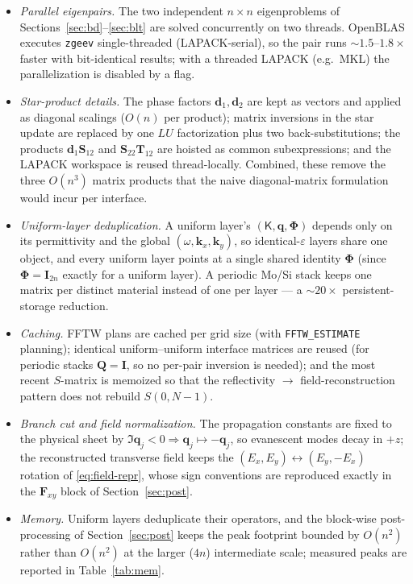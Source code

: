 \documentclass[11pt]{article}
\theoremstyle{remark}
\newcommand{\eps}{\varepsilon}
\newcommand{\kp}{\mathsf{K}}
\newcommand{\kk}{\mathbf{k}}
\newcommand{\Ph}{\mathbf{\Phi}}
\newcommand{\fq}{\mathbf{q}}
\newcommand{\Id}{\mathbf{I}}
\begin{document}
\begin{itemize}
\item \emph{Parallel eigenpairs.} The two independent $n\times n$ eigenproblems
  of Sections~\ref{sec:bd}--\ref{sec:blt} are solved concurrently on two
  threads. OpenBLAS executes \texttt{zgeev} single-threaded (LAPACK-serial), so
  the pair runs $\sim1.5$--$1.8\times$ faster with bit-identical results; with a
  threaded LAPACK (e.g.\ MKL) the parallelization is disabled by a flag.
\item \emph{Star-product details.} The phase factors
  $\mathbf{d}_1,\mathbf{d}_2$ are kept as vectors and applied as diagonal
  scalings ($O(n)$ per product); matrix inversions in the star update are
  replaced by one $LU$ factorization plus two back-substitutions; the products
  $\mathbf{d}_1\mathbf{S}_{12}$ and $\mathbf{S}_{22}\mathbf{T}_{12}$ are hoisted
  as common subexpressions; and the LAPACK workspace is reused
  thread-locally.  Combined, these remove the three $O(n^3)$ matrix products
  that the naive diagonal-matrix formulation would incur per interface.
\item \emph{Uniform-layer deduplication.} A uniform layer's
  $(\kp,\fq,\Ph)$ depends only on its permittivity and the global
  $(\omega,\kk_x,\kk_y)$, so identical-$\eps$ layers share one object, and
  every uniform layer points at a single shared identity $\Ph$ (since
  $\Ph=\Id_{2n}$ exactly for a uniform layer).  A periodic Mo/Si stack keeps
  one matrix per distinct material instead of one per layer --- a $\sim20\times$
  persistent-storage reduction.
\item \emph{Caching.} FFTW plans are cached per grid size (with
  \texttt{FFTW\_ESTIMATE} planning); identical uniform--uniform interface
  matrices are reused (for periodic stacks $\mathbf{Q}=\Id$, so no per-pair
  inversion is needed); and the most recent $S$-matrix is memoized so that the
  reflectivity $\to$ field-reconstruction pattern does not rebuild
  $S(0,N{-}1)$.
\item \emph{Branch cut and field normalization.} The propagation constants are
  fixed to the physical sheet by $\Im \fq_j<0\Rightarrow\fq_j\mapsto-\fq_j$,
  so evanescent modes decay in $+z$; the reconstructed transverse field keeps
  the $(E_x,E_y)\leftrightarrow(E_y,-E_x)$ rotation of
  \eqref{eq:field-repr}, whose sign conventions are reproduced exactly in the
  $\mathbf{F}_{xy}$ block of Section~\ref{sec:post}.
\item \emph{Memory.} Uniform layers deduplicate their operators, and the
  block-wise post-processing of Section~\ref{sec:post} keeps the peak footprint
  bounded by $O(n^2)$ rather than $O(n^2)$ at the larger ($4n$) intermediate
  scale; measured peaks are reported in Table~\ref{tab:mem}.
\end{itemize}
\end{document}
